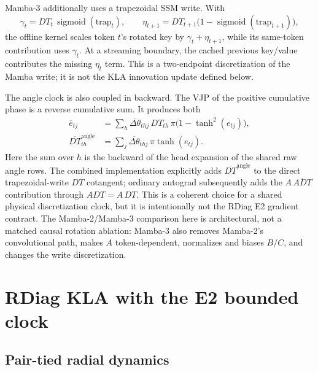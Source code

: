 \documentclass[11pt]{article}
\newcommand{\sg}{\operatorname{sigmoid}}
\begin{document}
Mamba-3 additionally uses a trapezoidal SSM write.  With
\begin{equation}
  \gamma_t=DT_t\,\sg(\mathrm{trap}_t),
  \qquad
  \eta_{t+1}=DT_{t+1}\bigl(1-\sg(\mathrm{trap}_{t+1})\bigr),
\end{equation}
the offline kernel scales token $t$'s rotated key by
$\gamma_t+\eta_{t+1}$, while its same-token contribution uses $\gamma_t$.  At a streaming boundary,
the cached previous key/value contributes the missing $\eta_t$ term.  This is a two-endpoint
discretization of the Mamba write; it is not the KLA innovation update defined below.

The angle clock is also coupled in backward.  The VJP of the positive cumulative phase is a
reverse cumulative sum.  It produces both
\begin{align}
  \overline e_{tj}
    &=\sum_h\overline{\Delta\theta}_{thj}\,DT_{th}\,
      \pi\bigl(1-\tanh^2(e_{tj})\bigr),\\
  \overline{DT}^{\mathrm{angle}}_{th}
    &=\sum_j\overline{\Delta\theta}_{thj}\,\pi\tanh(e_{tj}).
\end{align}
Here the sum over $h$ is the backward of the head expansion of the shared raw angle rows.  The
combined implementation explicitly adds $\overline{DT}^{\mathrm{angle}}$ to the direct
trapezoidal-write $DT$ cotangent; ordinary autograd subsequently adds the
$A\,\overline{ADT}$ contribution through $ADT=A\,DT$.  This is a coherent choice for a shared
physical discretization clock, but it is intentionally not the RDiag E2 gradient contract.
The Mamba-2/Mamba-3 comparison here is architectural, not a matched causal rotation ablation:
Mamba-3 also removes Mamba-2's convolutional path, makes $A$ token-dependent, normalizes and
biases $B/C$, and changes the write discretization.

\section{RDiag KLA with the E2 bounded clock}
\label{sec:rdiag}

\subsection{Pair-tied radial dynamics}
\end{document}
